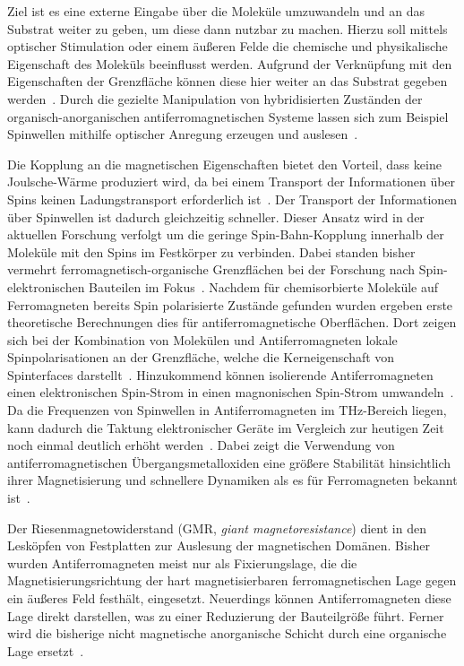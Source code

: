     Ziel ist es eine externe Eingabe über die Moleküle umzuwandeln und an das Substrat weiter zu geben, um diese dann nutzbar zu machen.
    Hierzu soll mittels optischer Stimulation oder einem äußeren Felde die chemische und physikalische Eigenschaft des Moleküls beeinflusst werden.
    Aufgrund der Verknüpfung mit den Eigenschaften der Grenzfläche können diese hier weiter an das Substrat gegeben werden~\cite{IF_16}.
    Durch die gezielte Manipulation von hybridisierten Zuständen der organisch-anorganischen antiferromagnetischen Systeme lassen sich zum Beispiel Spinwellen mithilfe optischer Anregung erzeugen und auslesen~\cite{SINFONIA}.

    Die Kopplung an die magnetischen Eigenschaften bietet den Vorteil, dass keine Joulsche-Wärme produziert wird, da bei einem Transport der Informationen über Spins keinen Ladungstransport erforderlich ist~\cite{AFM_3}.
    Der Transport der Informationen über Spinwellen ist dadurch gleichzeitig schneller.
    Dieser Ansatz wird in der aktuellen Forschung verfolgt um die geringe Spin-Bahn-Kopplung innerhalb der Moleküle mit den Spins im Festkörper zu verbinden.
    Dabei standen bisher vermehrt ferromagnetisch-organische Grenzflächen bei der Forschung nach Spin-elektronischen Bauteilen im Fokus~\cite{ma-DJ, AFM_5}.
    Nachdem für chemisorbierte Moleküle auf Ferromagneten bereits Spin polarisierte Zustände gefunden wurden \cite{IF_16} ergeben erste theoretische Berechnungen dies für antiferromagnetische Oberflächen.
    Dort zeigen sich bei der Kombination von Molekülen und Antiferromagneten lokale Spinpolarisationen an der Grenzfläche, welche die Kerneigenschaft von Spinterfaces darstellt~\cite{AFM_2}.
    Hinzukommend können isolierende Antiferromagneten einen elektronischen Spin-Strom in einen magnonischen Spin-Strom umwandeln~\cite{AFM_1}.
    Da die Frequenzen von Spinwellen in Antiferromagneten im \si{\tera\hertz}-Bereich liegen, kann dadurch die Taktung elektronischer Geräte im Vergleich zur heutigen Zeit noch einmal deutlich erhöht werden~\cite{AFM_5}.
    Dabei zeigt die Verwendung von antiferromagnetischen Übergangsmetalloxiden eine größere Stabilität hinsichtlich ihrer Magnetisierung und schnellere Dynamiken als es für Ferromagneten bekannt ist~\cite{AFM_1}.
    
    Der Riesenmagnetowiderstand (GMR, \textit{giant magnetoresistance}) dient in den Lesköpfen von Festplatten zur Auslesung der magnetischen Domänen.
    Bisher wurden Antiferromagneten meist nur als Fixierungslage, die die Magnetisierungsrichtung der hart magnetisierbaren ferromagnetischen Lage gegen ein äußeres Feld festhält, eingesetzt.
    Neuerdings können Antiferromagneten diese Lage direkt darstellen, was zu einer Reduzierung der Bauteilgröße führt.
    Ferner wird die bisherige nicht magnetische anorganische Schicht durch eine organische Lage ersetzt~\cite{bagrets_single_2012}.

